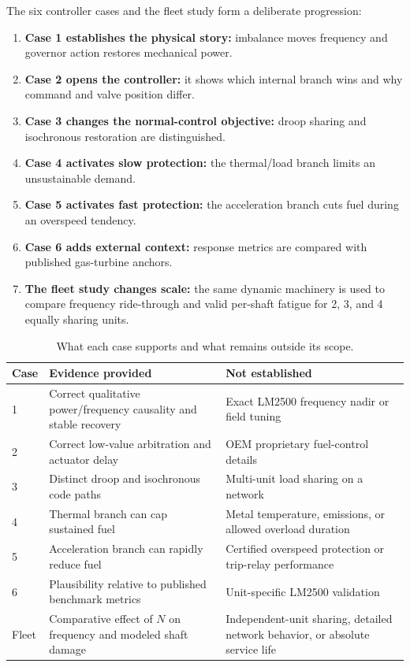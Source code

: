 \documentclass[11pt]{article}
\begin{document}
The six controller cases and the fleet study form a deliberate progression:
\begin{enumerate}
  \item \textbf{Case 1 establishes the physical story:} imbalance moves
        frequency and governor action restores mechanical power.
  \item \textbf{Case 2 opens the controller:} it shows which internal branch
        wins and why command and valve position differ.
  \item \textbf{Case 3 changes the normal-control objective:} droop sharing
        and isochronous restoration are distinguished.
  \item \textbf{Case 4 activates slow protection:} the thermal/load branch
        limits an unsustainable demand.
  \item \textbf{Case 5 activates fast protection:} the acceleration branch
        cuts fuel during an overspeed tendency.
  \item \textbf{Case 6 adds external context:} response metrics are compared
        with published gas-turbine anchors.
    \item \textbf{The fleet study changes scale:} the same dynamic machinery is
      used to compare frequency ride-through and valid per-shaft fatigue for
      2, 3, and 4 equally sharing units.
\end{enumerate}

\begin{table}[htbp]
\centering
\caption{What each case supports and what remains outside its scope.}
\small
\begin{tabular}{@{}p{}p{}p{}@{}}
\toprule
Case & Evidence provided & Not established \\
\midrule
1 & Correct qualitative power/frequency causality and stable recovery & Exact LM2500 frequency nadir or field tuning \\
2 & Correct low-value arbitration and actuator delay & OEM proprietary fuel-control details \\
3 & Distinct droop and isochronous code paths & Multi-unit load sharing on a network \\
4 & Thermal branch can cap sustained fuel & Metal temperature, emissions, or allowed overload duration \\
5 & Acceleration branch can rapidly reduce fuel & Certified overspeed protection or trip-relay performance \\
6 & Plausibility relative to published benchmark metrics & Unit-specific LM2500 validation \\
Fleet & Comparative effect of $N$ on frequency and modeled shaft damage & Independent-unit sharing, detailed network behavior, or absolute service life \\
\bottomrule
\end{tabular}
\end{table}
\end{document}
